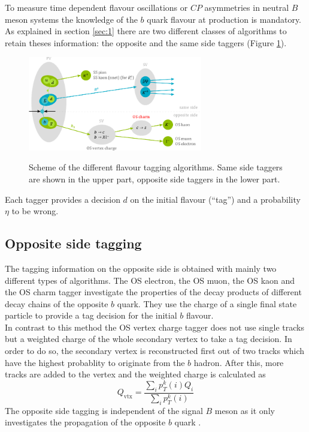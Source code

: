 \documentclass{PoS}
\begin{document}
To measure time dependent flavour oscillations or $C\!P$ asymmetries in neutral $B$ meson systems the knowledge of the $b$ quark flavour at production is mandatory. As explained in section \ref{sec:1} there are two different classes of algorithms to retain theses information: the opposite and the same side taggers (Figure \ref{fig:flavtagscheme}).
\begin{figure}[htbp]
	\begin{center}
		\includegraphics[width=0.68\textwidth, angle=0]{figs/FlavourTaggerScheme.pdf}
		\small{\caption{Scheme of the different flavour tagging algorithms. Same side taggers are shown in the upper part, opposite side taggers in the lower part.}}
		\label{fig:flavtagscheme}
	\end{center}
\end{figure}
Each tagger provides a decision $d$ on the initial flavour (\enquote{tag}) and a probability $\eta$ to be wrong.

\subsection{Opposite side tagging}\label{sec:OStagging}

The tagging information on the opposite side is obtained with mainly two different types of algorithms. The OS electron, the OS muon, the OS kaon and the OS charm tagger investigate the properties of the decay products of different decay chains of the opposite $b$ quark. They use the charge of a single final state particle to provide a tag decision for the initial $b$ flavour.\\
In contrast to this method the OS vertex charge tagger does not use single tracks but a weighted charge of the whole secondary vertex to take a tag decision. In order to do so, the secondary vertex is reconstructed first out of two tracks which have the highest probablity to originate from the $b$ hadron. After this, more tracks are added to the vertex and the weighted charge is calculated as
\begin{equation}
Q_\text{vtx}=\frac{\sum_i p_T^k(i)Q_i}{\sum_i p_T^k(i)}
\end{equation}  
The opposite side tagging is independent of the signal $B$ meson as it only investigates the propagation of the opposite $b$ quark \cite{1}.
\end{document}
